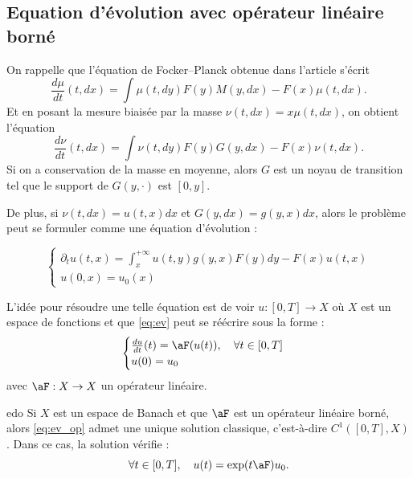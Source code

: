 \subsection{Equation d'évolution avec opérateur linéaire borné}

On rappelle que l'équation de Focker--Planck obtenue dans l'article \cite{frag_deaconu} s'écrit
\begin{equation}
	\frac{d\mu}{dt}(t,dx) = \int \mu(t,dy) F(y) M(y,dx) - F(x) \mu(t,dx).
	\label{eq:fock}
\end{equation}
Et en posant la mesure biaisée par la masse $\nu(t,dx) = x\mu(t,dx)$, on obtient l'équation
\begin{equation}
	\frac{d\nu}{dt}(t,dx) = \int \nu(t,dy) F(y) G(y,dx) - F(x) \nu(t,dx).
	\label{eq:fock_mass}
\end{equation}
Si on a conservation de la masse en moyenne, alors $G$ est un noyau de transition tel que le support
de $G(y, \cdot)$ est $[0,y]$.

De plus, si $\nu(t,dx) = u(t,x) dx$ et $G(y,dx) = g(y,x) dx$, alors le problème peut se formuler
comme une équation d'évolution :

\begin{equation}
	\begin{cases}
		\partial_t u(t,x) = \int_x^{+\infty} u(t,y) g(y,x) F(y) dy - F(x) u(t,x) \\
		u(0,x) = u_0(x)
	\end{cases}
	\label{eq:ev}
\end{equation}

\begin{important}
	L'idée pour résoudre une telle équation est de voir $u : [0,T] \to X$ où $X$ est un espace de fonctions et que \ref{eq:ev}
	peut se réécrire sous la forme :
	\begin{equation}
		\begin{cases}
			\frac{du}{dt}(t) = \aF(u(t)), \quad \forall t \in [0,T] \\
			u(0) = u_0
		\end{cases}
		\label{eq:ev_op}
	\end{equation}
	avec $\aF : X \to X$ un opérateur linéaire.
\end{important}

\begin{thm}{}{edo}
	Si $X$ est un espace de Banach et que $\aF$ est un opérateur linéaire borné, alors \ref{eq:ev_op} admet une unique solution classique, c'est-à-dire
	$C^1([0,T], X)$. Dans ce cas, la solution vérifie :
	\[
		\forall t \in [0,T], \quad u(t) = \exp(t \aF)u_0.
	\]
\end{thm}

